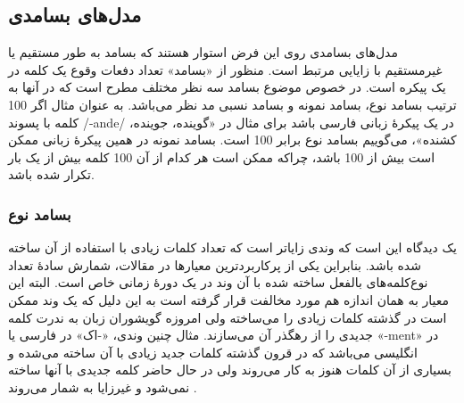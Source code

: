 \documentclass[12pt,onecolumn,a4paper]{article}
\begin{document}
    \subsection{مدل‌های بسامدی}
    مدل‌های بسامدی روی این فرض استوار هستند که بسامد به طور مستقیم یا غیرمستقیم با زایایی مرتبط است. منظور از «بسامد» تعداد دفعات وقوع یک کلمه در یک پیکره است. در خصوص موضوع بسامد سه نظر مختلف مطرح است که در آنها به ترتیب بسامد نوع‌، بسامد نمونه و بسامد نسبی مد نظر می‌باشد. به عنوان مثال اگر 100 کلمه با پسوند /-ande/ در یک پیکرهٔ زبانی فارسی باشد برای مثال در «گوینده، جوینده، کشنده»، می‌گوییم بسامد نوع برابر 100 است. بسامد نمونه در همین پیکرهٔ زبانی ممکن است بیش از 100 باشد، چراکه ممکن است هر کدام از آن 100 کلمه بیش از یک بار تکرار شده باشد.

    \subsubsection{بسامد نوع}
    یک دیدگاه این است که وندی زایاتر است که تعداد کلمات زیادی با استفاده از آن ساخته شده باشد. بنابراین یکی از پرکاربردترین معیارها در مقالات، شمارش سادۀ تعداد نوع‌کلمه‌های بالفعل ساخته شده با آن وند در یک دورۀ زمانی خاص است. البته این معیار به همان اندازه هم مورد مخالفت قرار گرفته است به این دلیل که یک وند ممکن است در گذشته کلمات زیادی را می‌ساخته ولی امروزه گویشوران زبان به ندرت کلمه جدیدی را از رهگذر آن می‌سازند. مثال چنین وندی، «-اک» در فارسی یا «-ment» در انگلیسی می‌باشد که در قرون گذشته کلمات جدید زیادی با آن ساخته می‌شده و بسیاری از آن کلمات هنوز به کار می‌روند ولی در حال حاضر کلمه جدیدی با آنها ساخته نمی‌شود و غیرزایا به شمار می‌روند .
\end{document}
